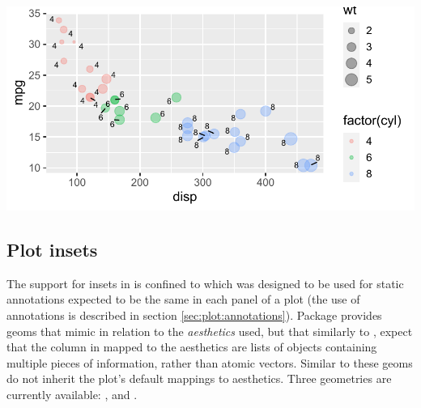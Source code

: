 \documentclass[krantz2]{krantz}\usepackage{knitr}
\begin{document}
\begin{knitrout}\footnotesize
{}\color{fgcolor}\begin{kframe}
\begin{alltt}
\hlstd{(} 
       \hlstd{(}     \hlstd{=}      \hlopt{+}
  \hlstd{()} \hlopt{+}
  \hlstd{(} \hlstd{=} \hlopt{/}\hlstd{)} \hlopt{+}
  \hlstd{(} \hlstd{=} \hlstd{,}  \hlstd{=} \hlstd{,}
                   \hlstd{=} \hlstd{,}  \hlstd{=} \hlstd{)}
\end{alltt}
\end{kframe}

{\centering \includegraphics[width=.7\textwidth]{figure/pos-repel-plot-01-1}

}



\end{knitrout}

\subsection{Plot insets}\label{sec:plot:insets}

The support for insets in  is confined to  which was designed to be used for static annotations expected to be the same in each panel of a plot (the use of annotations is described in section \ref{sec:plot:annotations}). Package  provides geoms that mimic  in relation to the \emph{aesthetics} used, but that similarly to , expect that the column in  mapped to the  aesthetics are lists of objects containing multiple pieces of information, rather than atomic vectors. Similar to  these geoms do not inherit the plot's default mappings to aesthetics. Three geometries are currently available: ,  and .
\end{document}
